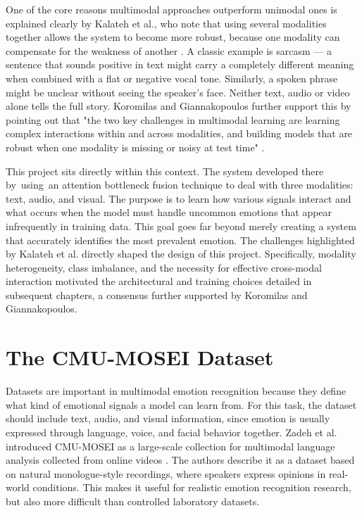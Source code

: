 One of the core reasons multimodal approaches outperform unimodal ones is explained clearly by Kalateh et al., who note that using several modalities together allows the system to become more robust, because one modality can compensate for the weakness of another \cite{kalateh2024systematic}. A classic example is sarcasm — a sentence that sounds positive in text might carry a completely different meaning when combined with a flat or negative vocal tone. Similarly, a spoken phrase might be unclear without seeing the speaker's face. Neither text, audio or video alone tells the full story. Koromilas and Giannakopoulos further support this by pointing out that "the two key challenges in multimodal learning are learning complex interactions within and across modalities, and building models that are robust when one modality is missing or noisy at test time" \cite{koromilas2021deep}.
 
This project sits directly within this context. The system developed there by using an attention bottleneck fusion technique to deal with three modalities: text, audio, and visual. The purpose is to learn how various signals interact and what occurs when the model must handle uncommon emotions that appear infrequently in training data. This goal goes far beyond merely creating a system that accurately identifies the most prevalent emotion.  The challenges highlighted by Kalateh et al. directly shaped the design of this project. Specifically, modality heterogeneity, class imbalance, and the necessity for effective cross-modal interaction motivated the architectural and training choices detailed in subsequent chapters, a consensus further supported by Koromilas and Giannakopoulos\cite{koromilas2021deep}.


\section{The CMU-MOSEI Dataset}

Datasets are important in multimodal emotion recognition because they define what kind of emotional signals a model can learn from. For this task, the dataset should include text, audio, and visual information, since emotion is usually expressed through language, voice, and facial behavior together. Zadeh et al. introduced CMU-MOSEI as a large-scale collection for multimodal language analysis collected from online videos \cite{zadeh2018multimodal}. The authors describe it as a dataset based on natural monologue-style recordings, where speakers express opinions in real-world conditions. This makes it useful for realistic emotion recognition research, but also more difficult than controlled laboratory datasets.

